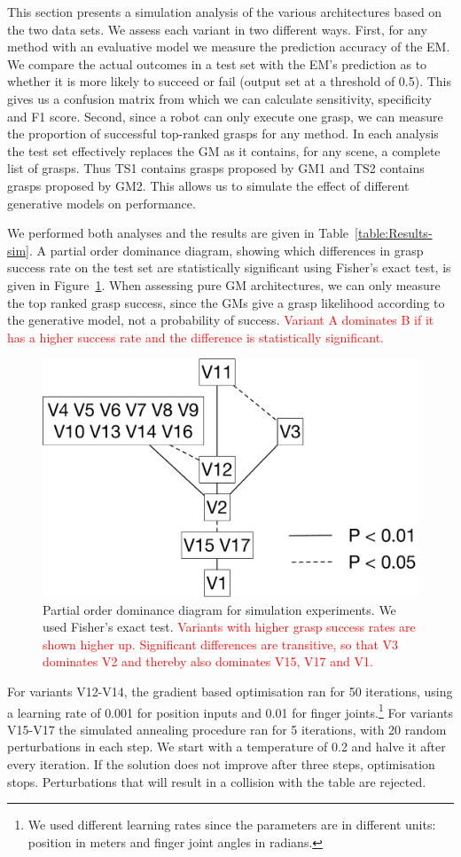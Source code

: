 This section presents a simulation analysis of the various architectures based on the two data sets. 
We assess each variant in two different ways. First, for any method with an evaluative model we  measure the prediction accuracy of the EM. We compare the actual outcomes in a test set with the EM's prediction as to whether it is more likely to succeed or fail (output set at a threshold of 0.5). This gives us a confusion matrix from which we can calculate sensitivity, specificity and F1 score. Second, since a robot can only execute one grasp, we can measure the proportion of successful top-ranked grasps for any method. In each analysis the test set effectively replaces the GM as it contains, for any scene, a complete list of grasps. Thus TS1 contains grasps proposed by GM1 and TS2 contains grasps proposed by GM2. This allows us to simulate the effect of different generative models on performance.

We performed both analyses and the results are given in Table~\ref{table:Results-sim}. A partial order dominance diagram, showing which differences in grasp success rate on the test set are statistically significant using Fisher's exact test, is given in Figure~\ref{fig:dominance}. When assessing pure GM architectures, we can only measure the top ranked grasp success, since the GMs give a grasp likelihood according to the generative model, not a probability of success. \textcolor{red}{Variant A dominates B if it has a higher success rate and the difference is statistically significant.}

\begin{figure}
\centering
\includegraphics[width=0.5\columnwidth]{images/dominance}
\caption{Partial order dominance diagram for simulation experiments. We used Fisher's exact test. \textcolor{red}{Variants with higher grasp success rates are shown higher up. Significant differences are transitive, so that V3 dominates V2 and thereby also dominates V15, V17 and V1.}}
\label{fig:dominance}
\end{figure}

For variants V12-V14, the gradient based optimisation ran for 50 iterations, using a learning rate of 0.001 for position inputs and 0.01 for finger joints.\footnote{We used different learning rates since the parameters are in different units: position in meters and finger joint angles in radians.} For variants V15-V17 the simulated annealing procedure ran for 5 iterations, with 20 random perturbations in each step. We start with a temperature of 0.2 and halve it after every iteration. If the solution does not improve after three steps, optimisation stops. Perturbations that will result in a collision with the table are rejected.


